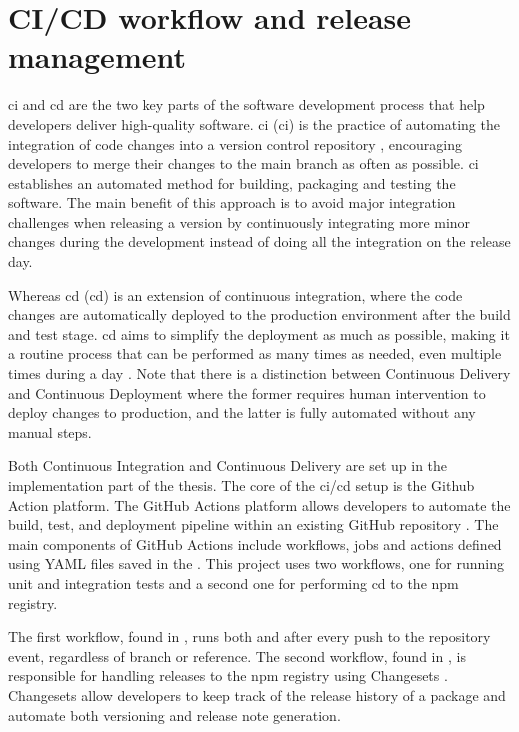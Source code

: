 \section{CI/CD workflow and release management}

\acrfull{ci} and \acrlong{cd} are the two key parts of the software development process that help developers deliver high-quality software. \acrlong{ci} (\acrshort{ci}) is the practice of automating the integration of code changes into a version control repository \cite{atlassianContinuousIntegrationVs}, encouraging developers to merge their changes to the main branch as often as possible. \acrshort{ci} establishes an automated method for building, packaging and testing the software. The main benefit of this approach is to avoid major integration challenges when releasing a version by continuously integrating more minor changes during the development instead of doing all the integration on the release day.

Whereas \acrlong{cd} (\acrshort{cd}) is an extension of continuous integration, where the code changes are automatically deployed to the production environment after the build and test stage. \acrshort{cd} aims to simplify the deployment as much as possible, making it a routine process that can be performed as many times as needed, even multiple times during a day \cite{WhatCICD}. Note that there is a distinction between Continuous Delivery and Continuous Deployment where the former requires human intervention to deploy changes to production, and the latter is fully automated without any manual steps.

Both Continuous Integration and Continuous Delivery are set up in the implementation part of the thesis. The core of the \acrshort{ci}/\acrshort{cd} setup is the Github Action platform. The GitHub Actions platform allows developers to automate the build, test, and deployment pipeline within an existing GitHub repository \cite{UnderstandingGitHubActions}. The main components of GitHub Actions include workflows, jobs and actions defined using YAML files saved in the . This project uses two workflows, one for running unit and integration tests and a second one for performing \acrfull{cd} to the \acrshort{npm} registry.

The first workflow, found in , runs both  and  after every push to the repository event, regardless of branch or reference. The second workflow, found in , is responsible for handling releases to the \acrshort{npm} registry using Changesets \cite{ChangesetsChangesets2023}. Changesets allow developers to keep track of the release history of a package and automate both versioning and release note generation.

